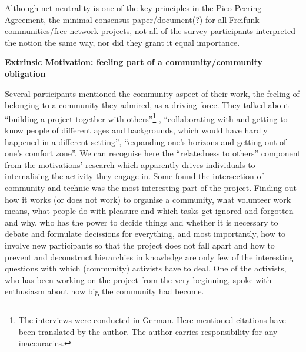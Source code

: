 Although net neutrality is one of the key principles in the Pico-Peering-Agreement, the minimal consensus paper/document(?) for all Freifunk communities/free network projects, not all of the survey participants interpreted the notion the same way, nor did they grant it equal importance.



\textbf{Extrinsic Motivation: feeling part of a community/community obligation}

Several participants mentioned the community aspect of their work, the feeling of belonging to a community they admired, as a driving force.
They talked about ``building a project together with others''\footnote{The interviews were conducted in German. Here mentioned citations have been translated by the author. The author carries responsibility for any inaccuracies.}
, ``collaborating with and getting to know people of different ages and backgrounds, which would have hardly happened in a different setting'', ``expanding one's horizons and getting out of one's comfort zone''.
We can recognise here the ``relatedness to others'' component from the motivations' research which apparently drives individuals to internalising the activity they engage in.
Some found the intersection of community and technic was the most interesting part of the project.
Finding out how it works (or does not work) to organise a community, what volunteer work means, what people do with pleasure and which tasks get ignored and forgotten and why, who has the power to decide things and whether it is necessary to debate and formulate decissions for everything, and most importantly, how to involve new participants so that the project does not fall apart and how to prevent and deconstruct hierarchies in knowledge are only few of the interesting questions with which (community) activists have to deal.
One of the activists, who has been working on the project from the very beginning, spoke with enthusiasm about how big the community had become.

